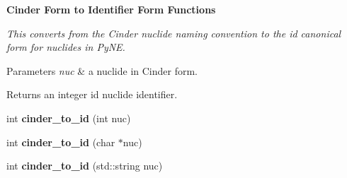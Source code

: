 \begin{Indent}{\bf Cinder Form to Identifier Form Functions}\par
{\em This converts from the Cinder nuclide naming convention to the id canonical form for nuclides in Py\-N\-E. 
\begin{DoxyParams}{Parameters}
{\em nuc} & a nuclide in Cinder form. \\
\hline
\end{DoxyParams}
\begin{DoxyReturn}{Returns}
an integer id nuclide identifier. 
\end{DoxyReturn}
}\begin{DoxyCompactItemize}
\item 
\hypertarget{namespacepyne_1_1nucname_a5c016b1b66515eb8050137ac45afdfd0}{int {\bfseries cinder\-\_\-to\-\_\-id} (int nuc)}\label{namespacepyne_1_1nucname_a5c016b1b66515eb8050137ac45afdfd0}

\item 
\hypertarget{namespacepyne_1_1nucname_a0f8028aedef58c8ee70f24ecfa4f8c72}{int {\bfseries cinder\-\_\-to\-\_\-id} (char $\ast$nuc)}\label{namespacepyne_1_1nucname_a0f8028aedef58c8ee70f24ecfa4f8c72}

\item 
\hypertarget{namespacepyne_1_1nucname_a72bc35fb19b1cfd3dc8a11d9a8963d4a}{int {\bfseries cinder\-\_\-to\-\_\-id} (std\-::string nuc)}\label{namespacepyne_1_1nucname_a72bc35fb19b1cfd3dc8a11d9a8963d4a}

\end{DoxyCompactItemize}
\end{Indent}
